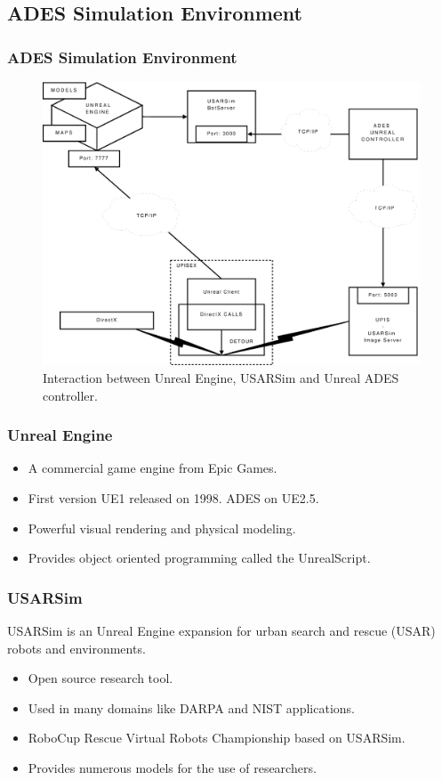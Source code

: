 \documentclass{beamer}
\begin{document}
\subsection{ADES Simulation Environment}
\frame
{
	\frametitle{ADES Simulation Environment}
	\begin{figure}[ht]
	\begin{center}
	\includegraphics[width=.6\paperwidth]{../img/unrealades.eps}
	\caption{Interaction between Unreal Engine, USARSim and Unreal ADES controller.}
	\label{fig:unrealades}
	\end{center}
	\end{figure}	
}

\frame
{
	\frametitle{Unreal Engine}
	\begin{itemize}
		\item A commercial game engine from Epic Games.
		\item First version UE1 released on 1998. ADES on UE2.5.
		\item Powerful visual rendering and physical modeling.
		\item Provides object oriented programming called the UnrealScript.
	\end{itemize}
}
		
\begin{frame}
	\frametitle{USARSim}
	\begin{block}{}
		USARSim is an Unreal Engine expansion for urban search and rescue (USAR) robots and environments.
	\end{block}
	\begin{itemize}
		\item Open source research tool.
		\item Used in many domains like DARPA and NIST applications. 
		\item RoboCup Rescue Virtual Robots Championship based on USARSim.
		\item Provides numerous models for the use of researchers.
	\end{itemize}
\end{frame}
\end{document}
